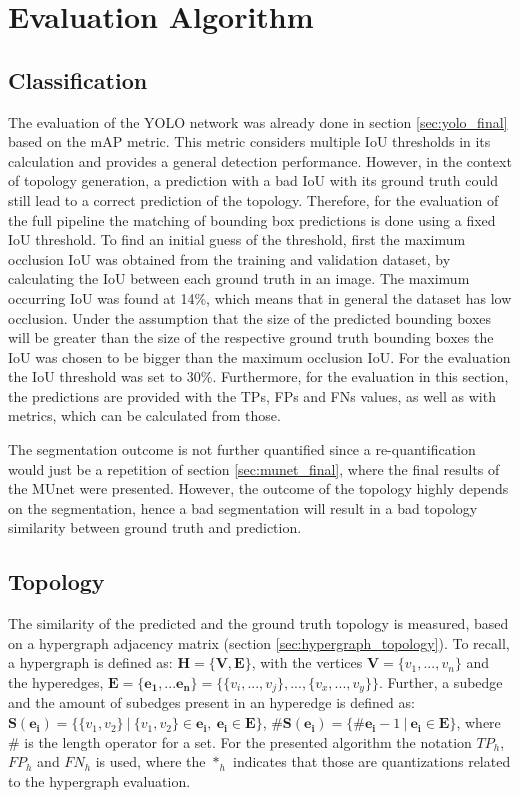 \section{Evaluation Algorithm}
\label{sec:eval_algo}

\subsection{Classification}

The evaluation of the \ac{YOLO} network was already done in section \ref{sec:yolo_final} based on the \ac{mAP} metric.
This metric considers multiple \ac{IoU} thresholds in its calculation and provides a general detection performance.
However, in the context of topology generation, a prediction with a bad \ac{IoU} with its ground truth could still lead to a correct prediction of the topology.
Therefore, for the evaluation of the full pipeline the matching of bounding box predictions is done using a fixed \ac{IoU} threshold.
To find an initial guess of the threshold, first the maximum occlusion \ac{IoU} was obtained from the training and validation dataset, by calculating the \ac{IoU} between each ground truth in an image.
The maximum occurring \ac{IoU} was found at 14\%, which means that in general the dataset has low occlusion.
Under the assumption that the size of the predicted bounding boxes will be greater than the size of the respective ground truth bounding boxes the \ac{IoU} was chosen to be bigger than the maximum occlusion \ac{IoU}.
For the evaluation the \ac{IoU} threshold was set to 30\%.
Furthermore, for the evaluation in this section, the predictions are provided with the \acp{TP}, \acp{FP} and \acp{FN} values, as well as with metrics, which can be calculated from those.

The segmentation outcome is not further quantified since a re-quantification would just be a repetition of section \ref{sec:munet_final}, where the final results of the \ac{MUnet} were presented.
However, the outcome of the topology highly depends on the segmentation, hence a bad segmentation will result in a bad topology similarity between ground truth and prediction.

\subsection{Topology}

The similarity of the predicted and the ground truth topology is measured, based on a hypergraph adjacency matrix (section \ref{sec:hypergraph_topology}).
To recall, a hypergraph is defined as: $\mathbf{H} = \{\mathbf{V}, \mathbf{E}\}$, with the vertices $\mathbf{V} = \{v_1,...,v_n\}$ and the hyperedges, $\mathbf{E} = \{\mathbf{e_1},...\mathbf{e_n}\} = \{\{v_i,...,v_j\},...,\{v_x,...,v_y\}\}$.
Further, a subedge and the amount of subedges present in an hyperedge is defined as: $\mathbf{S}(\mathbf{e_i}) = \{ \{v_1,v_2\}\ |\ \{v_1,v_2\} \in \mathbf{e_i},\ \mathbf{e_i} \in \mathbf{E}\}$, $\#\mathbf{S}(\mathbf{e_i}) = \{ \#\mathbf{e_i} - 1\ |\  \mathbf{e_i} \in \mathbf{E}\}$, where \# is the length operator for a set.
For the presented algorithm the notation $TP_h$, $FP_h$ and $FN_h$ is used, where the $*_h$ indicates that those are quantizations related to the hypergraph evaluation.

